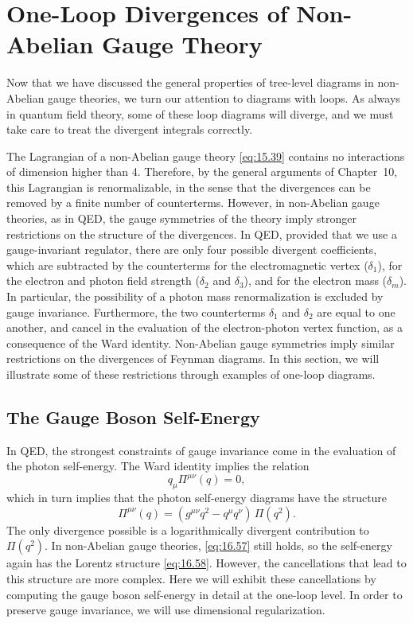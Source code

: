 \section{One-Loop Divergences of Non-Abelian Gauge Theory}

Now that we have discussed the general properties of tree-level diagrams in
non-Abelian gauge theories, we turn our attention to diagrams with loops.  As
always in quantum field theory, some of these loop diagrams will diverge, and
we must take care to treat the divergent integrals correctly.

The Lagrangian of a non-Abelian gauge theory \eqref{eq:15.39} contains no
interactions of dimension higher than 4.  Therefore, by the general arguments
of Chapter~10, this Lagrangian is renormalizable, in the sense that the
divergences can be removed by a finite number of counterterms.  However, in
non-Abelian gauge theories, as in QED, the gauge symmetries of the theory
imply stronger restrictions on the structure of the divergences.  In QED,
provided that we use a gauge-invariant regulator, there are only four possible
divergent coefficients, which are subtracted by the counterterms for the
electromagnetic vertex ($\delta_1$), for the electron and photon field
strength ($\delta_2$ and $\delta_3$), and for the electron mass ($\delta_m$).
In particular, the possibility of a photon mass renormalization is excluded by
gauge invariance.  Furthermore, the two counterterms $\delta_1$ and
$\delta_2$ are equal to one another, and cancel in the evaluation of the
electron-photon vertex function, as a consequence of the Ward identity.
Non-Abelian gauge symmetries imply similar restrictions on the divergences of
Feynman diagrams.  In this section, we will illustrate some of these
restrictions through examples of one-loop diagrams.

\subsection{The Gauge Boson Self-Energy}

In QED, the strongest constraints of gauge invariance come in the evaluation
of the photon self-energy.  The Ward identity implies the relation
\begin{equation}
  q_\mu\Pi^{\mu\nu}(q) = 0 ,
  \label{eq:16.57}
\end{equation}
which in turn implies that the photon self-energy diagrams have the structure
\begin{equation}
  \Pi^{\mu\nu}(q) = (g^{\mu\nu}q^2 - q^\mu q^\nu)\,\Pi(q^2) .
  \label{eq:16.58}
\end{equation}
The only divergence possible is a logarithmically divergent contribution to
$\Pi(q^2)$.  In non-Abelian gauge theories, \eqref{eq:16.57} still holds, so
the self-energy again has the Lorentz structure \eqref{eq:16.58}.  However,
the cancellations that lead to this structure are more complex.  Here we will
exhibit these cancellations by computing the gauge boson self-energy in
detail at the one-loop level.  In order to preserve gauge invariance, we will
use dimensional regularization.


